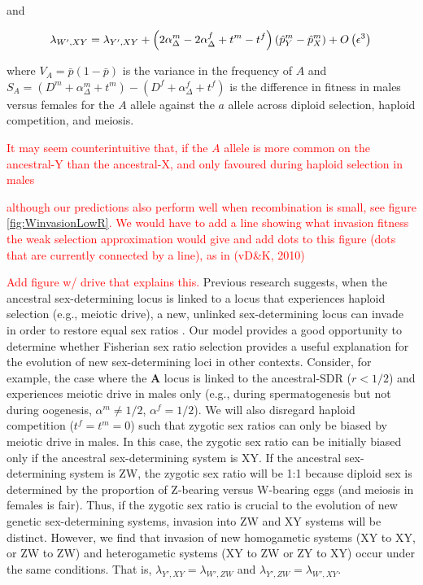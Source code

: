 \documentclass[12pt]{article}
\begin{document}
\noindent 
and 

\begin{equation}
\lambda_{W',XY} =\lambda_{Y',XY}+\left(2\alpha_{\Delta}^m-2\alpha_{\Delta}^f+t^m-t^f \right) \left( \hat{p}^m_Y-\hat{p}^m_X \right)
+O\left(\epsilon^3 \right) \\
\label{eq:lambda_neoW}
\end{equation}

\noindent
where $V_{A}=\bar{p}(1-\bar{p})$ is the variance in the frequency of $A$ and $S_{A}=(D^m +\alpha_{\Delta}^m+t^m) - (D^f+\alpha_{\Delta}^f+t^f)$ is the difference in fitness in males versus females for the $A$ allele against the $a$ allele across diploid selection, haploid competition, and meiosis. 

\textcolor{red}{It may seem counterintuitive that, if the $A$ allele is more common on the ancestral-Y than the ancestral-X, and only favoured during haploid selection in males}


\textcolor{red}{although our predictions also perform well when recombination is small, see figure \ref{fig:WinvasionLowR}. We would have to add a line showing what invasion fitness the weak selection approximation would give and add dots to this figure (dots that are currently connected by a line), as in (vD\&K, 2010) }

\textcolor{red}{Add figure w/ drive that explains this.}
Previous research suggests, when the ancestral sex-determining locus is linked to a locus that experiences haploid selection (e.g., meiotic drive), a new, unlinked sex-determining locus can invade in order to restore equal sex ratios \citep{Kozielska:2010vm}. 
Our model provides a good opportunity to determine whether Fisherian sex ratio selection provides a useful explanation for the evolution of new sex-determining loci in other contexts. 
Consider, for example, the case where the \textbf{A} locus is linked to the ancestral-SDR ($r<1/2$) and experiences meiotic drive in males only (e.g., during spermatogenesis but not during oogenesis, $\alpha^m \neq 1/2$, $\alpha^f=1/2$). 
We will also disregard haploid competition ($t^f=t^m=0$) such that zygotic sex ratios can only be biased by meiotic drive in males. 
In this case, the zygotic sex ratio can be initially biased only if the ancestral sex-determining system is XY. 
If the ancestral sex-determining system is ZW, the zygotic sex ratio will be 1:1 because diploid sex is determined by the proportion of Z-bearing versus W-bearing eggs (and meiosis in females is fair).
Thus, if the zygotic sex ratio is crucial to the evolution of new genetic sex-determining systems, invasion into ZW and XY systems will be distinct. 
However, we find that invasion of new homogametic systems (XY to XY, or ZW to ZW) and heterogametic systems (XY to ZW or ZY to XY) occur under the same conditions. 
That is, $\lambda_{Y',XY}=\lambda_{W',ZW}$ and $\lambda_{Y',ZW}=\lambda_{W',XY}$. 
\end{document}
